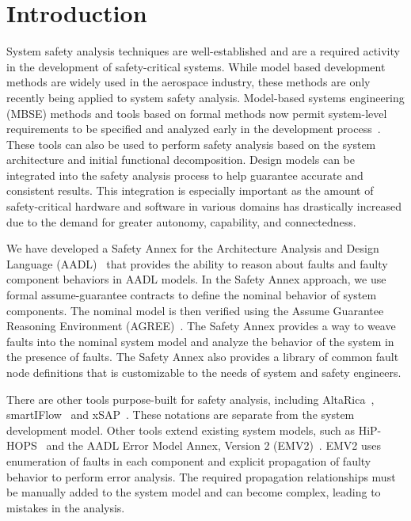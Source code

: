 \section{Introduction}
\label{sec:intro}
System safety analysis techniques are well-established and are a required activity in the development of safety-critical systems. While model based development methods are widely used in the aerospace industry, these methods are only recently being applied to system safety analysis. Model-based systems engineering (MBSE) methods and tools based on formal methods now permit system-level requirements to be specified and analyzed early in the development process~\cite{NFM2012:CoGaMiWhLaLu,CAV2015:BoCiGrMa}. These tools can also be used to perform safety analysis based on the system architecture and initial functional decomposition. Design models can be integrated into the safety analysis process to help guarantee accurate and consistent results. This integration is especially important as the amount of safety-critical hardware and software in various domains has drastically increased due to the demand for greater autonomy, capability, and connectedness.

We have developed a Safety Annex for the Architecture Analysis and Design Language (AADL)~\cite{FeilerModelBasedEngineering2012} that provides the ability to reason about faults and faulty component behaviors in AADL models. In the Safety Annex approach, we use formal assume-guarantee contracts to define the nominal behavior of system components. The nominal model is then verified using the Assume Guarantee Reasoning Environment (AGREE)~\cite{NFM2012:CoGaMiWhLaLu}. The Safety Annex  provides a way to weave faults into the nominal system model and analyze the behavior of the system in the presence of faults. The Safety Annex also provides a library of common fault node definitions that is customizable to the needs of system and safety engineers.

There are other tools purpose-built for safety analysis, including AltaRica~\cite{PROSVIRNOVA2013127}, smartIFlow~\cite{info8010007} and xSAP~\cite{DBLP:conf/tacas/BittnerBCCGGMMZ16}. These notations are separate from the system development model. Other tools extend existing system models, such as HiP-HOPS~\cite{CHEN201391} and the AADL Error Model Annex, Version 2 (EMV2)~\cite{EMV2}. EMV2 uses enumeration of faults in each component and explicit propagation of faulty behavior to perform error analysis. The required propagation relationships must be manually added to the system model and can become complex, leading to mistakes in the analysis.

